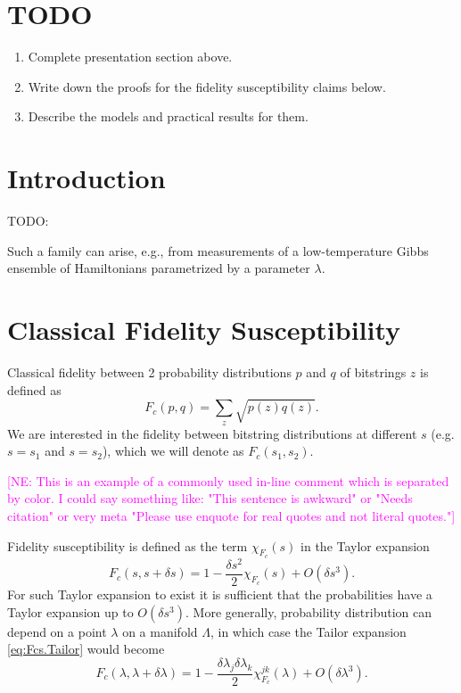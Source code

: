 \documentclass[
  american,aps,pra,reprint,floatfix,nofootinbib,superscriptaddress
]{revtex4-2}
\newcommand{\NE}[1]{\textcolor{magenta}{[NE: #1]}}
\begin{document}
\section{TODO}
\begin{enumerate}
\item Complete presentation section above.
\item Write down the proofs for the fidelity susceptibility claims below.
\item Describe the models and practical results for them.
\end{enumerate}

\section{Introduction}
TODO:

Such a family can arise, e.g., from measurements of a low-temperature
Gibbs ensemble of Hamiltonians parametrized by a parameter $\lambda$.

\section{Classical Fidelity Susceptibility}
Classical fidelity between 2 probability distributions $p$ and $q$ of
bitstrings $z$ is defined as
\begin{equation}
  F_c(p, q) = \sum_{z} \sqrt{p(z) q(z)}.
\end{equation}
We are interested in the fidelity between bitstring distributions at different
$s$ (e.g. $s=s_1$ and $s=s_2$), which we will denote as $F_c(s_1, s_2)$.

\NE{This is an example of a commonly used in-line comment which is separated by color. I could say something like: "This sentence is awkward" or "Needs citation" or very meta "Please use enquote for real quotes and not literal quotes."}

Fidelity susceptibility is defined as the term $\chi_{F_c}(s)$ in the Taylor
expansion
\begin{equation}
\label{eq:Fcs.Tailor}
  F_c(s, s+\delta s) = 1 - \frac{\delta s^2}{2} \chi_{F_c}(s) + O(\delta s^3).
\end{equation}
For such Taylor expansion to exist it is sufficient that the probabilities have
a Taylor expansion up to $O(\delta s^3)$. More generally, probability
distribution can depend on a point $\lambda$ on a manifold $\Lambda$,
in which case the Tailor expansion \eqref{eq:Fcs.Tailor} would become
\begin{equation}
\label{eq:Fcl.Tailor}
  F_c(\lambda, \lambda+\delta \lambda) = 1 - \frac{\delta \lambda_{j} \delta \lambda_k}{2} \chi_{F_c}^{jk}(\lambda) + O(\delta \lambda^3).
\end{equation}
\end{document}
